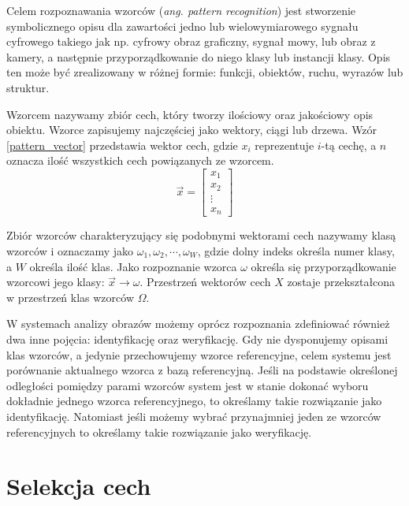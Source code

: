 
Celem rozpoznawania wzorców (\emph{ang. pattern recognition}) jest stworzenie symbolicznego opisu dla zawartości jedno lub wielowymiarowego sygnału cyfrowego takiego jak np. cyfrowy obraz graficzny, sygnał mowy, lub obraz z kamery, a następnie przyporządkowanie do niego klasy lub instancji klasy. Opis ten może być zrealizowany w różnej formie: funkcji, obiektów, ruchu, wyrazów lub struktur.

Wzorcem nazywamy zbiór cech, który tworzy ilościowy oraz jakościowy opis obiektu. Wzorce zapisujemy najczęściej jako wektory, ciągi lub drzewa. Wzór \ref{pattern_vector} przedstawia wektor cech, gdzie $x_{i}$ reprezentuje $i$-tą cechę, a $n$ oznacza ilość wszystkich cech powiązanych ze wzorcem.\cite{GONZALES01}
\begin{equation} 
\label{pattern_vector} 
\overrightarrow{x}=
\begin{bmatrix}x_1\\
x_2\\
\vdots\\
x_n  
\end{bmatrix}
\end{equation}

Zbiór wzorców charakteryzujący się podobnymi wektorami cech nazywamy klasą wzorców i oznaczamy jako $\omega_1, \omega_2, \cdots, \omega_{W}$, gdzie dolny indeks określa numer klasy, a $W$ określa ilość klas. Jako rozpoznanie wzorca $\omega$ określa się przyporządkowanie wzorcowi jego klasy: $\overrightarrow{x} \rightarrow \omega$. Przestrzeń wektorów cech $X$ zostaje przekształcona w przestrzeń klas wzorców $\Omega$.

W systemach analizy obrazów możemy oprócz rozpoznania zdefiniować również dwa inne pojęcia: identyfikację oraz weryfikację. Gdy nie dysponujemy opisami klas wzorców, a jedynie przechowujemy wzorce referencyjne, celem systemu jest porównanie aktualnego wzorca z bazą referencyjną. Jeśli na podstawie określonej odległości pomiędzy parami wzorców system jest w stanie dokonać wyboru dokładnie jednego wzorca referencyjnego, to określamy takie rozwiązanie jako identyfikację. Natomiast jeśli możemy wybrać przynajmniej jeden ze wzorców referencyjnych to określamy takie rozwiązanie jako weryfikację.

\section{Selekcja cech}


